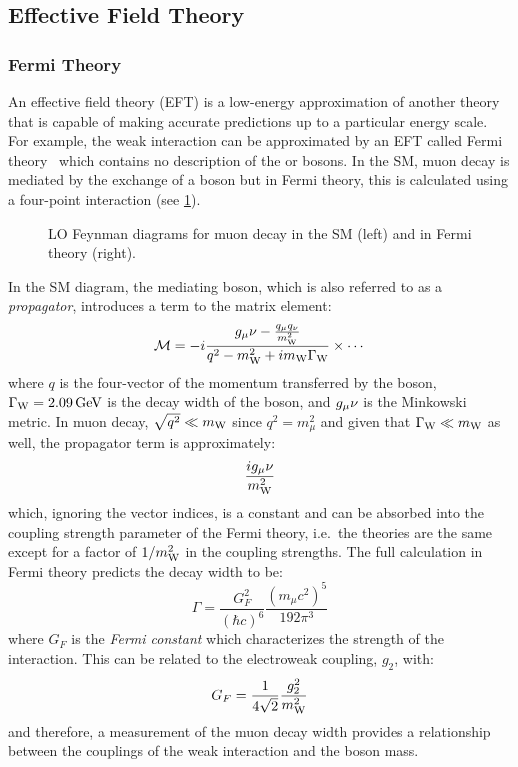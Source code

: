 \subsection{Effective Field Theory}\label{sec:EFT}
\subsubsection{Fermi Theory}

An effective field theory (EFT) is a low-energy approximation of another theory that is capable of making accurate predictions up to a particular energy scale. For example, the weak interaction can be approximated by an EFT called Fermi theory~\cite{Fermi:1934hr} which contains no description of the \PW or \PZ bosons. In the SM, muon decay is mediated by the exchange of a \PW boson but in Fermi theory, this is calculated using a four-point interaction (see \cref{fig:muon_decay_diagrams}). 

\begin{figure}
  \centering
  \hspace{1cm}
  \caption[LO Feynman Diagrams for Muon Decay in the SM and in Fermi Theory]{LO Feynman diagrams for muon decay in the SM (left) and in Fermi theory (right).}\label{fig:muon_decay_diagrams}
\end{figure}

In the SM diagram, the mediating \PW boson, which is also referred to as a \textit{propagator}, introduces a term to the matrix element:
\begin{equation}
  \mathcal{M} = - i \frac{g_\mu\nu - \frac{q_\mu q_\nu}{m_\mathrm{W}^2}}{q^2 - m_\mathrm{W}^2 + im_\mathrm{W} \Gamma_\mathrm{W}} \times \cdots
\end{equation}
where $q$ is the four-vector of the momentum transferred by the \PW boson, $\Gamma_\mathrm{W}=2.09\,\text{Ge\hspace{-.08em}V}$ is the decay width of the \PW boson, and $g_\mu\nu$ is the Minkowski metric.
In muon decay, $\sqrt{q^2} \ll m_\mathrm{W}$ since $q^2 = m_\mu^2$ and given that $\Gamma_\mathrm{W} \ll m_\mathrm{W}$ as well, the propagator term is approximately:
\begin{equation}
  \frac{i g_\mu\nu}{m_\mathrm{W}^2}
\end{equation}
which, ignoring the vector indices, is a constant and can be absorbed into the coupling strength parameter of the Fermi theory, i.e.\ the theories are the same except for a factor of $1/m_\mathrm{W}^2$ in the coupling strengths. The full calculation in Fermi theory predicts the decay width to be:
\begin{equation}
  \Gamma = \frac{G_F^2}{(\hbar c)^6}\frac{(m_\mu c^2)^5}{192 \pi^3}
\end{equation}
where $G_F$ is the \textit{Fermi constant} which characterizes the strength of the interaction. This can be related to the electroweak  coupling, $g_2$, with:
\begin{equation}
  G_F = \frac{1}{4\sqrt{2}} \frac{g_2^2}{m_\mathrm{W}^2}
\end{equation}
and therefore, a measurement of the muon decay width provides a relationship between the couplings of the weak interaction and the \PW boson mass. 

